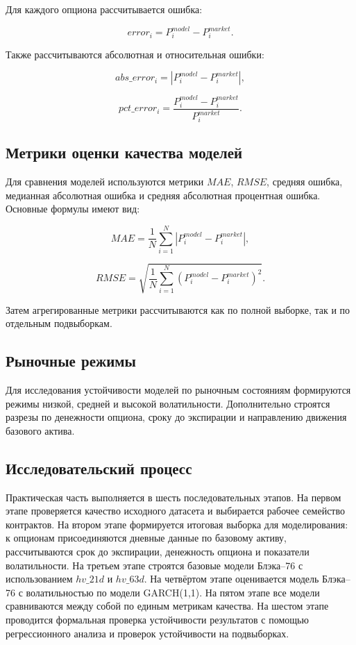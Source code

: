 \documentclass[11pt,a4paper]{article}
\begin{document}
Для каждого опциона рассчитывается ошибка:

\begin{equation}
error_i = P_i^{model} - P_i^{market}.
\end{equation}

Также рассчитываются абсолютная и относительная ошибки:

\begin{equation}
abs\_error_i = |P_i^{model} - P_i^{market}|,
\end{equation}

\begin{equation}
pct\_error_i =
\frac{
P_i^{model} - P_i^{market}
}{
P_i^{market}
}.
\end{equation}

\subsection{Метрики оценки качества моделей}

Для сравнения моделей используются метрики $MAE$, $RMSE$, средняя ошибка, медианная абсолютная ошибка и средняя абсолютная процентная ошибка. Основные формулы имеют вид:

\begin{equation}
MAE =
\frac{1}{N}
\sum_{i=1}^{N}
|P_i^{model} - P_i^{market}|,
\end{equation}

\begin{equation}
RMSE =
\sqrt{
\frac{1}{N}
\sum_{i=1}^{N}
(P_i^{model} - P_i^{market})^2
}.
\end{equation}

Затем агрегированные метрики рассчитываются как по полной выборке, так и по отдельным подвыборкам.

\subsection{Рыночные режимы}

Для исследования устойчивости моделей по рыночным состояниям формируются режимы низкой, средней и высокой волатильности. Дополнительно строятся разрезы по денежности опциона, сроку до экспирации и направлению движения базового актива.

\subsection{Исследовательский процесс}

Практическая часть выполняется в шесть последовательных этапов. На первом этапе проверяется качество исходного датасета и выбирается рабочее семейство контрактов. На втором этапе формируется итоговая выборка для моделирования: к опционам присоединяются дневные данные по базовому активу, рассчитываются срок до экспирации, денежность опциона и показатели волатильности. На третьем этапе строятся базовые модели Блэка--76 с использованием $hv\_21d$ и $hv\_63d$. На четвёртом этапе оценивается модель Блэка--76 с волатильностью по модели GARCH(1,1). На пятом этапе все модели сравниваются между собой по единым метрикам качества. На шестом этапе проводится формальная проверка устойчивости результатов с помощью регрессионного анализа и проверок устойчивости на подвыборках.
\end{document}
